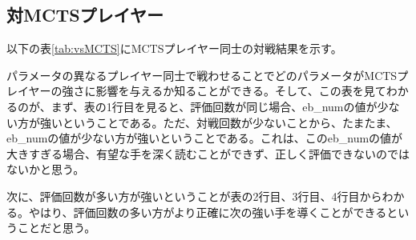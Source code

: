\documentclass{jsarticle}
\begin{document}
\subsection{対MCTSプレイヤー}
以下の表\ref{tab:vsMCTS}にMCTSプレイヤー同士の対戦結果を示す。\par
\begin{table}[hbtp]
    \caption{対MCTSプレイヤーでの勝率}
    \label{tab:vsMCTS}
    \begin{center}
    \end{center}
\end{table}
パラメータの異なるプレイヤー同士で戦わせることでどのパラメータがMCTSプレイヤーの強さに影響を与えるか知ることができる。そして、この表を見てわかるのが、まず、表の1行目を見ると、評価回数が同じ場合、eb\_numの値が少ない方が強いということである。ただ、対戦回数が少ないことから、たまたま、eb\_numの値が少ない方が強いということである。これは、このeb\_numの値が大きすぎる場合、有望な手を深く読むことができず、正しく評価できないのではないかと思う。\par
次に、評価回数が多い方が強いということが表の2行目、3行目、4行目からわかる。やはり、評価回数の多い方がより正確に次の強い手を導くことができるということだと思う。
\end{document}
